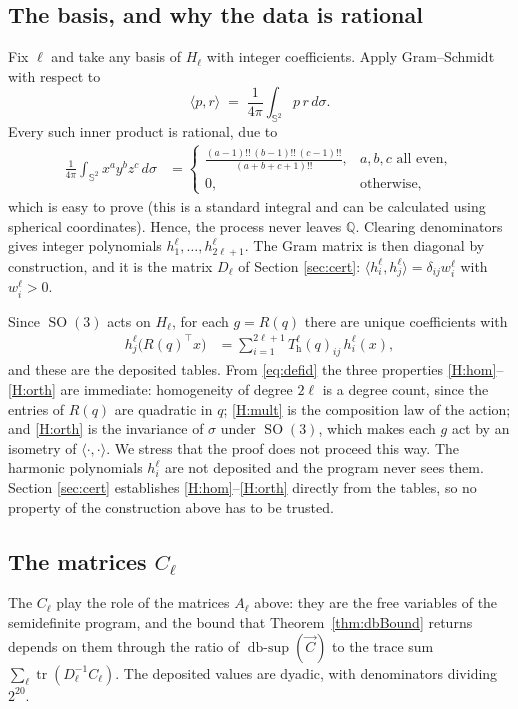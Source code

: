 \documentclass[reqno]{amsart}
\theoremstyle{definition}
\DeclareMathOperator{\SO}{SO}
\DeclareMathOperator{\tr}{tr}
\DeclareMathOperator{\dbsup}{db\text{-}sup}
\newcommand{\Q}{\mathbb{Q}}
\newcommand{\Sph}{\mathbb{S}}
\begin{document}
\subsection{The basis, and why the data is rational}
Fix $\ell$ and take any basis of $H_\ell$ with integer coefficients. Apply Gram--Schmidt with
respect to
\[
\langle p,r\rangle\;=\;\frac1{4\pi}\int_{\Sph^2}p\,r\,d\sigma .
\]
Every such inner product is rational, due to 
\begin{align*}
\frac1{4\pi}\int_{\Sph^2}x^ay^bz^c\,d\sigma&=
\left\{\begin{array}{ll}
\frac{(a-1)!!\,(b-1)!!\,(c-1)!!}{(a+b+c+1)!!}, & a,b,c \text{ all even},\\
0,& \text{otherwise},
\end{array}\right. 
\end{align*}
which is easy to prove (this is a standard integral and can be calculated using spherical coordinates).
Hence, the process never leaves
$\Q$. Clearing denominators gives integer polynomials $h^\ell_1,\dots,h^\ell_{2\ell+1}$. The Gram
matrix is then diagonal by construction, and it is the matrix $D_\ell$ of Section \ref{sec:cert}:
$\langle h^\ell_i,h^\ell_j\rangle=\delta_{ij}w^\ell_i$ with $w^\ell_i>0$.

Since $\SO(3)$ acts on $H_\ell$, for each $g=R(q)$ there are unique coefficients with
\begin{align}
h^\ell_j\bigl(R(q)^\top x\bigr)&=\sum_{i=1}^{2\ell+1}T^\ell_{\mathrm h}(q)_{ij}\,h^\ell_i(x),
\label{eq:defid}
\end{align}
and these are the deposited tables. From \eqref{eq:defid} the three properties
\ref{H:hom}--\ref{H:orth} are immediate: homogeneity of degree $2\ell$ is a degree count, since the
entries of $R(q)$ are quadratic in $q$; \ref{H:mult} is the composition law of the action; and
\ref{H:orth} is the invariance of $\sigma$ under $\SO(3)$, which makes each $g$ act by an isometry
of $\langle\cdot,\cdot\rangle$. We stress that the proof does not proceed this way. The harmonic
polynomials $h^\ell_i$ are not deposited and the program never sees them. Section \ref{sec:cert}
establishes \ref{H:hom}--\ref{H:orth} directly from the tables, so no property of the construction
above has to be trusted.

 
\subsection{The matrices $C_\ell$}
The $C_\ell$ play the role of the matrices $A_\ell$ above: they are the free variables of the
semidefinite program, and the bound that Theorem~\ref{thm:dbBound} returns depends on them through
the ratio of $\dbsup(\overrightarrow C)$ to the trace sum $\sum_\ell\tr(D_\ell^{-1}C_\ell)$. The
deposited values are dyadic, with denominators dividing $2^{20}$.
\end{document}

